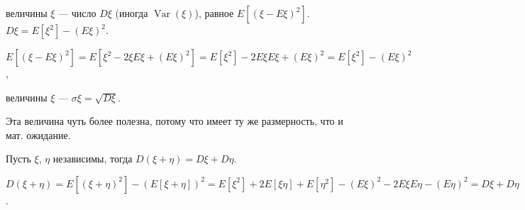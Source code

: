 \documentclass{article}
\begin{document}
\begin{itemize}
\begin{Comment}
        \end{Comment}
        \dfn {} величины $\xi$ --- число $D\xi$ (иногда $\operatorname{Var}(\xi)$), равное $E[(\xi-E\xi)^2]$.
        \thm $D\xi=E[\xi^2]-(E\xi)^2$.
        \begin{Proof}
            $E[(\xi-E\xi)^2]=E[\xi^2-2\xi E\xi+(E\xi)^2]=E[\xi^2]-2E\xi E\xi+(E\xi)^2=E[\xi^2]-(E\xi)^2$,
        \end{Proof}
        \dfn {} величины $\xi$ --- $\sigma \xi=\sqrt{D\xi}$.
        \begin{Comment}
            Эта величина чуть более полезна, потому что имеет ту же размерность, что и мат. ожидание.
        \end{Comment}
        \thm Пусть $\xi$, $\eta$ независимы, тогда $D(\xi+\eta)=D\xi+D\eta$.
        \begin{Proof}
            $D(\xi+\eta)=E[(\xi+\eta)^2]-(E[\xi+\eta])^2=E[\xi^2]+2E[\xi\eta]+E[\eta^2]-(E\xi)^2-2E\xi E\eta-(E\eta)^2=D\xi+D\eta$.
        \end{Proof}
    \end{itemize}
\end{document}
